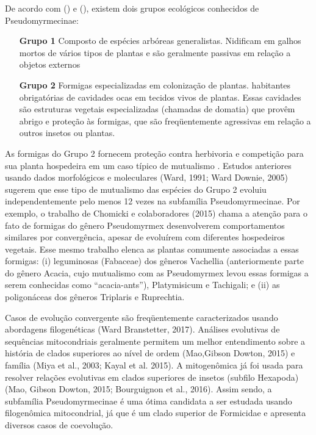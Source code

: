 \documentclass[../DISSERTACAO_MAIN.tex]{subfiles}
\begin{document}
De acordo com  (\citeyear{Janzen1966}) e  (\citeyear{Ward1991}), existem dois grupos ecológicos conhecidos de Pseudomyrmecinae: 

\begin{itemize}
	\item [\textbf{Grupo 1}] Composto de espécies arbóreas generalistas. Nidificam em galhos mortos de vários tipos de plantas e são geralmente passivas em relação a objetos externos
	\item [\textbf{Grupo 2}]  Formigas especializadas em colonização de plantas. habitantes obrigatórias de cavidades ocas em tecidos vivos de plantas. Essas cavidades são estruturas vegetais especializadas (chamadas de domatia) que provêm abrigo e proteção às formigas, que são freqüentemente agressivas em relação a outros insetos ou plantas. 
\end{itemize}

As formigas do Grupo 2 fornecem proteção contra herbivoria e competição para sua planta hospedeira em um caso típico de mutualismo \cite{Janzen1966, Ward1991}. Estudos anteriores usando dados morfológicos e moleculares (Ward, 1991; Ward  Downie, 2005) sugerem que esse tipo de mutualismo das espécies do Grupo 2 evoluiu independentemente pelo menos 12 vezes na subfamília Pseudomyrmecinae. Por exemplo, o trabalho de Chomicki e colaboradores (2015) chama a atenção para o fato de formigas do gênero Pseudomyrmex desenvolverem comportamentos similares por convergência, apesar de evoluírem com diferentes hospedeiros vegetais. Esse mesmo trabalho elenca as plantas comumente associadas a essas formigas: (i) leguminosas (Fabaceae) dos gêneros Vachellia (anteriormente parte do gênero Acacia, cujo mutualismo com as Pseudomyrmex levou essas formigas a serem conhecidas como “acacia-ants”), Platymisicum e Tachigali; e (ii) as poligonáceas dos gêneros Triplaris e Ruprechtia.

Casos de evolução convergente são freqüentemente caracterizados usando abordagens filogenéticas (Ward  Branstetter, 2017). Análises evolutivas de sequências mitocondriais geralmente permitem um melhor entendimento sobre a história de clados superiores ao nível de ordem (Mao,Gibson  Dowton, 2015) e família (Miya et al., 2003; Kayal et al. 2015). A mitogenômica já foi usada para resolver relações evolutivas em clados superiores de insetos (subfilo Hexapoda) (Mao, Gibson  Dowton, 2015; Bourguignon et al., 2016). Assim sendo, a subfamília Pseudomyrmecinae é uma ótima candidata a ser estudada usando filogenômica mitocondrial, já que é um clado superior de Formicidae e apresenta diversos casos de coevolução.
\end{document}

